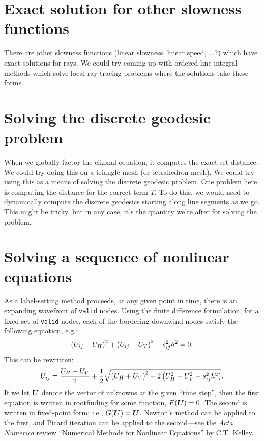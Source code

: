 \documentclass[eikonal.tex]{subfiles}
\begin{document}
\section{Exact solution for other slowness functions}

There are other slowness functions (linear slowness, linear speed,
...?) which have exact solutions for rays. We could try coming up with
ordered line integral methods which solve local ray-tracing problems
where the solutions take these forms.

\section{Solving the discrete geodesic problem}

When we globally factor the eikonal equation, it computes the exact
set distance. We could try doing this on a triangle mesh (or
tetrahedron mesh). We could try using this as a means of solving the
discrete geodesic problem. One problem here is computing the distance
for the correct term $T$. To do this, we would need to dynamically
compute the discrete geodesics starting along line segments as we
go. This might be tricky, but in any case, it's the quantity we're
after for solving the problem.

\section{Solving a sequence of nonlinear equations}

As a label-setting method proceeds, at any given point in time, there
is an expanding wavefront of \texttt{valid} nodes. Using the finite
difference formulation, for a fixed set of \texttt{valid} nodes, each
of the bordering downwind nodes satisfy the following equation, e.g.:
\begin{equation}
  \left(U_{ij} - U_H\right)^2 + \left(U_{ij} - U_V\right)^2 - s_{ij}^2 h^2 = 0.
\end{equation}
This can be rewritten:
\begin{equation}
  U_{ij} = \frac{U_H + U_V}{2} + \frac{1}{2} \sqrt{\left(U_H + U_V\right)^2 - 2\left(U_H^2 + U_V^2 - s_{ij}^2 h^2\right)}.
\end{equation}
If we let $\boldsymbol{U}$ denote the vector of unknowns at the given ``time
step'', then the first equation is written in rootfinding for some
function, $F(\boldsymbol{U}) = 0$. The second is written in fixed-point form;
i.e., $G(\boldsymbol{U}) = \boldsymbol{U}$. Newton's method can be applied to the first,
and Picard iteration can be applied to the second---see the \emph{Acta
  Numerica} review ``Numerical Methods for Nonlinear Equations'' by
C.T. Kelley.
\end{document}
